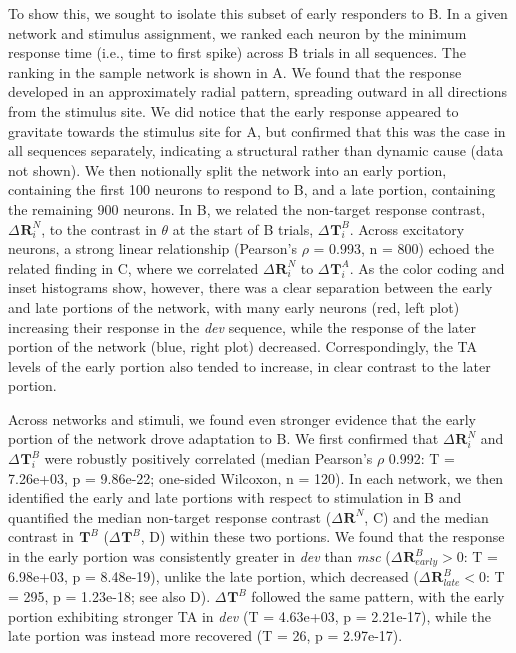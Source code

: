 \documentclass[9pt,lineno,onehalfspacing]{elife}
\newcommand{\dev}{\textit{dev}}
\newcommand{\msc}{\textit{msc}}
\newcommand{\R}[3][]{{}^{#1}_{}\boldsymbol R^{#2}_{#3}}
\newcommand{\T}[3][]{{}^{#1}_{}\boldsymbol T^{#2}_{#3}}
\begin{document}
To show this, we sought to isolate this subset of early responders to B. In a given network and stimulus assignment, we ranked each neuron by the minimum response time (i.e., time to first spike) across B trials in all sequences. The ranking in the sample network is shown in A. We found that the response developed in an approximately radial pattern, spreading outward in all directions from the stimulus site. We did notice that the early response appeared to gravitate towards the stimulus site for A, but confirmed that this was the case in all sequences separately, indicating a structural rather than dynamic cause (data not shown). We then notionally split the network into an early portion, containing the first 100 neurons to respond to B, and a late portion, containing the remaining 900 neurons. In B, we related the non-target response contrast, $\Delta \R{N}{i}$, to the contrast in $\theta$ at the start of B trials, $\Delta \T{B}{i}$. Across excitatory neurons, a strong linear relationship (Pearson's $\rho$ = 0.993, n = 800) echoed the related finding in C, where we correlated $\Delta \R{N}{i}$ to $\Delta \T{A}{i}$. As the color coding and inset histograms show, however, there was a clear separation between the early and late portions of the network, with many early neurons (red, left plot) increasing their response in the \dev{} sequence, while the response of the later portion of the network (blue, right plot) decreased. Correspondingly, the TA levels of the early portion also tended to increase, in clear contrast to the later portion.

Across networks and stimuli, we found even stronger evidence that the early portion of the network drove adaptation to B. We first confirmed that $\Delta \R{N}{i}$ and $\Delta \T{B}{i}$ were robustly positively correlated (median Pearson's $\rho$ 0.992: T = 7.26e+03, p = 9.86e-22; one-sided Wilcoxon, n = 120). In each network, we then identified the early and late portions with respect to stimulation in B and quantified the median non-target response contrast ($\Delta \R{N}{}$, C) and the median contrast in $\T{B}{}$ ($\Delta \T{B}{}$, D) within these two portions. We found that the response in the early portion was consistently greater in \dev{} than \msc{} ($\Delta \R{B}{early} > 0$: T = 6.98e+03, p = 8.48e-19), unlike the late portion, which decreased ($\Delta \R{B}{late} < 0$: T = 295, p = 1.23e-18; see also D). $\Delta \T{B}{}$ followed the same pattern, with the early portion exhibiting stronger TA in \dev{} (T = 4.63e+03, p = 2.21e-17), while the late portion was instead more recovered (T = 26, p = 2.97e-17).
\end{document}
